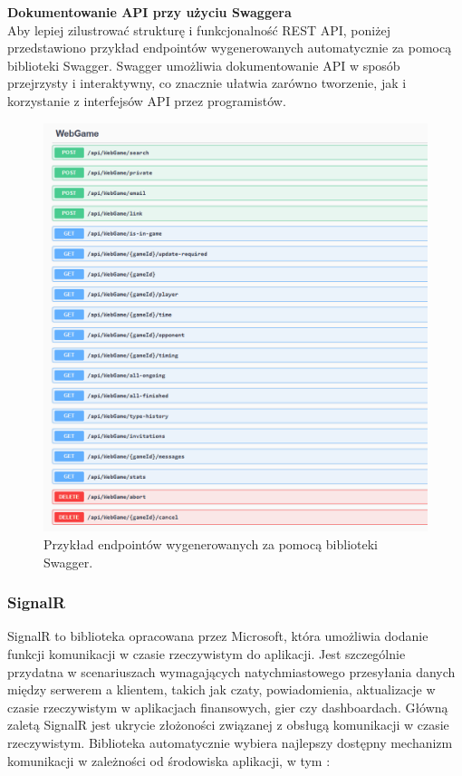 \documentclass[twoside]{projektInzynierskiMS1}
\begin{document}
\newpage

\noindent \textbf{Dokumentowanie API przy użyciu Swaggera}\\
Aby lepiej zilustrować strukturę i funkcjonalność REST API, poniżej przedstawiono przykład endpointów wygenerowanych automatycznie za pomocą biblioteki Swagger. Swagger umożliwia dokumentowanie API w sposób przejrzysty i interaktywny, co znacznie ułatwia zarówno tworzenie, jak i korzystanie z interfejsów API przez programistów.

\vspace{0.5cm}
\begin{figure}[h!]
    \centering
    \includegraphics[width=1\textwidth]{images/swagger_api.png}
    \caption{Przykład endpointów wygenerowanych za pomocą biblioteki Swagger.}
\end{figure}

\newpage

\subsubsection{SignalR}

\noindent
SignalR to biblioteka opracowana przez Microsoft, która umożliwia dodanie funkcji komunikacji w czasie rzeczywistym do aplikacji. Jest szczególnie przydatna w scenariuszach wymagających natychmiastowego przesyłania danych między serwerem a klientem, takich jak czaty, powiadomienia, aktualizacje w czasie rzeczywistym w aplikacjach finansowych, gier czy dashboardach. Główną zaletą SignalR jest ukrycie złożoności związanej z obsługą komunikacji w czasie rzeczywistym. Biblioteka automatycznie wybiera najlepszy dostępny mechanizm komunikacji w zależności od środowiska aplikacji, w tym \cite{SignalRIntro}:
\end{document}
